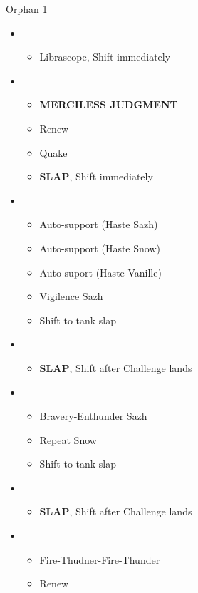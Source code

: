 \documentclass{report}
\begin{document}
\begin{battle}{Orphan 1}
\begin{multicols}{2}
\begin{itemize}
    \item \second
    \begin{itemize}
        \item Librascope, Shift immediately
    \end{itemize}
    \item \third
    \begin{itemize}
        \item \textbf{MERCILESS JUDGMENT}
        \item Renew
        \item Quake
        \item \textbf{SLAP}, Shift immediately
    \end{itemize}
    \item \fourth
    \begin{itemize}
        \item Auto-support (Haste Sazh)
        \item Auto-support (Haste Snow)
        \item Auto-suport (Haste Vanille)
        \item Vigilence Sazh
        \item Shift to tank slap
    \end{itemize}
    \item \third
    \begin{itemize}
        \item \textbf{SLAP}, Shift after Challenge lands
    \end{itemize}
    \item \fourth
    \begin{itemize}
        \item Bravery-Enthunder Sazh
        \item Repeat Snow
        \item Shift to tank slap
    \end{itemize}
    \item \third
    \begin{itemize}
        \item \textbf{SLAP}, Shift after Challenge lands
    \end{itemize}
    \item \fifth
    \begin{itemize}
        \item Fire-Thudner-Fire-Thunder
        \item Renew

\end{itemize}
\end{itemize}
\end{multicols}
\end{battle}
\end{document}
